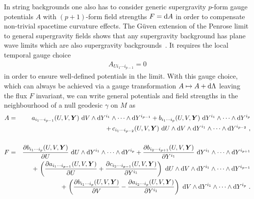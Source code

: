 \documentclass[11pt,a4paper]{article}
\newcommand{\mbf}[1]{{\boldsymbol {#1} }}
\def\dd{{\rm d}}
\def\nn{\nonumber}
\def\bea{\begin{eqnarray}}
\def\eea{\end{eqnarray}}
\newcommand{\beq}{\begin{eqnarray}}
\newcommand{\eeq}{\end{eqnarray}}
\begin{document}
In string backgrounds one also has to consider generic supergravity $p$-form
gauge potentials $A$ with $(p+1)$-form field strengths $F=\dd A$ in
order to compensate non-trivial spacetime curvature effects. The
G\"uven extension of the Penrose limit to general supergravity fields
shows that any supergravity background has plane wave limits which are
also supergravity backgrounds~\cite{Guven1}. It requires the local
temporal gauge choice
\beq
A_{Ui_1\cdots i_{p-1}}=0
\label{PGgaugechoice}\eeq
in order to ensure well-defined potentials in the limit. With this
gauge choice, which can always be achieved via a gauge transformation
$A\mapsto A+\dd\Lambda$ leaving the flux $F$ invariant, we can write
general potentials and field strengths in the neighbourhood of a null
geodesic $\gamma$ on $M$ as
\bea
A&=&a_{i_1\cdots i_{p-1}}(U,V,\mbf Y)~\dd V\wedge\dd
Y^{i_1}\wedge\cdots\wedge\dd Y^{i_{p-1}}+b_{i_1\cdots i_{p}}
(U,V,\mbf Y)~\dd Y^{i_1}\wedge\cdots\wedge\dd Y^{i_p}
\nn\\&&+\,c_{i_1\cdots i_{p-2}}(U,V,\mbf Y)
{}~\dd U\wedge\dd V\wedge\dd Y^{i_1}\wedge
\cdots\wedge\dd Y^{i_{p-2}} \ , \label{Anull}\\&&{~~~~}_{~~}^{~~}\nn\\
F&=&\frac{\partial b_{i_1\cdots i_p}(U,V,\mbf Y)}
{\partial U}~\dd U\wedge\dd Y^{i_1}\wedge\cdots\wedge\dd Y^{i_p}
+\frac{\partial b_{i_2\cdots i_{p+1}}(U,V,\mbf Y)}
{\partial Y^{i_1}}~\dd Y^{i_1}\wedge\cdots\wedge\dd Y^{i_{p+1}}
\nn\\&&+\,\left(\frac{\partial a_{i_1\cdots i_{p-1}}
(U,V,\mbf Y)}{\partial U}+\frac{\partial c_{i_2\cdots
  i_{p-1}}(U,V,\mbf Y)}{\partial Y^{i_1}}\right)~
\dd U\wedge\dd V\wedge\dd Y^{i_1}\wedge\cdots\wedge\dd Y^{i_{p-1}}
\nn\\&&+\,\left(\frac{\partial b_{i_1\cdots i_p}
(U,V,\mbf Y)}{\partial V}-\frac{\partial a_{i_2\cdots
  i_p}(U,V,\mbf Y)}{\partial Y^{i_1}}\right)~
\dd V\wedge\dd Y^{i_1}\wedge\cdots\wedge\dd Y^{i_p} \ .
\label{Fnull}\eea
\end{document}
